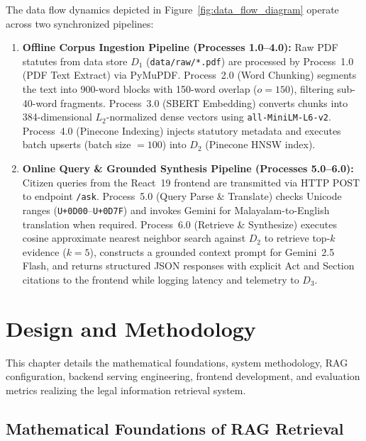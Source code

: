 \documentclass[12pt,a4paper]{report}
\begin{document}
The data flow dynamics depicted in Figure~\ref{fig:data_flow_diagram} operate across two synchronized pipelines:
\begin{enumerate}
    \item \textbf{Offline Corpus Ingestion Pipeline (Processes 1.0--4.0):} Raw PDF statutes from data store $D_1$ (\texttt{data/raw/*.pdf}) are processed by Process~1.0 (PDF Text Extract) via PyMuPDF. Process~2.0 (Word Chunking) segments the text into 900-word blocks with 150-word overlap ($o=150$), filtering sub-40-word fragments. Process~3.0 (SBERT Embedding) converts chunks into 384-dimensional $L_2$-normalized dense vectors using \texttt{all-MiniLM-L6-v2}. Process~4.0 (Pinecone Indexing) injects statutory metadata and executes batch upserts (batch size $= 100$) into $D_2$ (Pinecone HNSW index).
    \item \textbf{Online Query \& Grounded Synthesis Pipeline (Processes 5.0--6.0):} Citizen queries from the React~19 frontend are transmitted via HTTP POST to endpoint \texttt{/ask}. Process~5.0 (Query Parse \& Translate) checks Unicode ranges (\texttt{U+0D00}--\texttt{U+0D7F}) and invokes Gemini for Malayalam-to-English translation when required. Process~6.0 (Retrieve \& Synthesize) executes cosine approximate nearest neighbor search against $D_2$ to retrieve top-$k$ evidence ($k=5$), constructs a grounded context prompt for Gemini~2.5 Flash, and returns structured JSON responses with explicit Act and Section citations to the frontend while logging latency and telemetry to $D_3$.
\end{enumerate}



\chapter{Design and Methodology}

This chapter details the mathematical foundations, system methodology, RAG configuration, backend serving engineering, frontend development, and evaluation metrics realizing the legal information retrieval system.

\section{Mathematical Foundations of RAG Retrieval}
\end{document}
